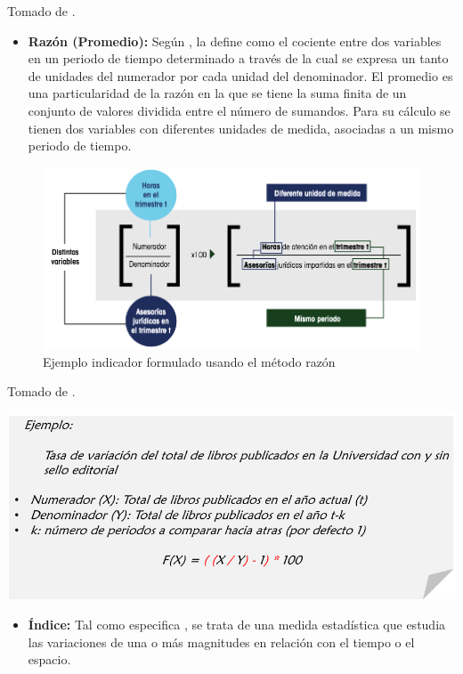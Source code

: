 \documentclass[
]{book}
\providecommand{\tightlist}{%
  \setlength{\itemsep}{0pt}\setlength{\parskip}{0pt}}
\begin{document}
Tomado de \citet{coneval2013manual}.

\begin{itemize}
\tightlist
\item
  \textbf{Razón (Promedio):}
  Según \citet{coneval2013manual}, la define como el cociente entre dos variables en un periodo de tiempo determinado a través de la cual se expresa un tanto de unidades del numerador por cada unidad del denominador. El promedio es una particularidad de la razón en la que se tiene la suma finita de un conjunto de valores dividida entre el número de sumandos. Para su cálculo se tienen dos variables con diferentes unidades de medida, asociadas a un mismo periodo de tiempo.
\end{itemize}

\begin{figure}

{\centering \includegraphics[width=0.9\linewidth]{Imagenes/figura_14} 

}

\caption{Ejemplo indicador formulado usando el método razón}\label{fig:unnamed-chunk-9}
\end{figure}

Tomado de \citet{coneval2013manual}.

\begin{center}\includegraphics[width=0.7\linewidth]{Imagenes/texto_3} \end{center}

\begin{itemize}
\tightlist
\item
  \textbf{Índice:}
  Tal como especifica \citet{coneval2013manual}, se trata de una medida estadística que estudia las variaciones de una o más magnitudes en relación con el tiempo o el espacio.
\end{itemize}
\end{document}
